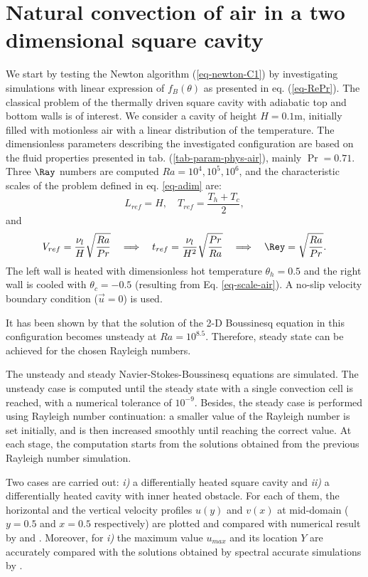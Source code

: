 \section{Natural convection of air in a two dimensional square cavity}\label{sec: natconv-air-2D}
We start by testing the Newton algorithm (\ref{eq-newton-C1}) by investigating simulations with linear expression of $f_B(\theta)$ as presented in eq. (\ref{eq-RePr}).
The classical problem of the thermally driven square cavity with adiabatic top and bottom walls is of interest.
We consider a cavity of height $H = 0.1$m, initially filled with motionless air with a linear distribution of the temperature. 
The dimensionless parameters describing the investigated configuration are based on the fluid properties presented in tab. (\ref{tab-param-phys-air}), mainly $\Pr = 0.71$.
Three $\Ray$ numbers are computed $Ra = 10^4, 10^5, 10^6$, and
the characteristic scales of the problem defined in eq. \ref{eq-adim} are:
\begin{equation} \label{eq-scale-air}
	L_{ref} = H, \quad T_{ref} = \frac{T_h + T_c}{2},
\end{equation}
and
\begin{equation} \label{eq-scaling-3}
   V_{ref} = \frac{\nu_l}{H} \sqrt{\frac{Ra}{Pr}} 
   \quad \Longrightarrow \quad t_{ref} = \frac{\nu_l}{H^2} \sqrt{\frac{Pr}{Ra}} 
   \quad \Longrightarrow \quad \Rey = \sqrt{\frac{Ra}{Pr}}.
\end{equation} 
The left wall is heated with dimensionless hot temperature $\theta_h = 0.5$ and the right wall is cooled with $\theta_c = -0.5$ (resulting from Eq. \ref{eq-scale-air}). 
A no-slip velocity boundary condition ($\vec u = 0$) is used.

It has been shown by \cite{LeQuere91} that the solution of the 2-D Boussinesq equation in this configuration becomes unsteady at $Ra = 10^{8.5}$.
Therefore, steady state can be achieved for the chosen Rayleigh numbers.

The unsteady and steady Navier-Stokes-Boussinesq equations are simulated.
The unsteady case is computed until the steady state with a single convection cell is reached, with a numerical tolerance of $10^{-9}$.
Besides, the steady case is performed using Rayleigh number continuation:
a smaller value of the Rayleigh number is set initially, and is then increased smoothly until reaching the correct value.
At each stage, the computation starts from the solutions obtained from the previous Rayleigh number simulation.

Two cases are carried out: {\it i)} a differentially heated square cavity and {\it ii)} a differentially heated cavity with inner heated obstacle.
For each of them, the horizontal and the vertical velocity profiles $u(y)$ and $v(x)$ at mid-domain ($y=0.5$ and $x=0.5$ respectively) are plotted and compared with numerical result by \cite{LeQuere91} and \cite{Raluca2013}. 
Moreover, for {\it i)} the maximum value $u_{max}$ and its location $Y$ are accurately compared with the solutions obtained by spectral accurate simulations by \cite{LeQuere91}.


